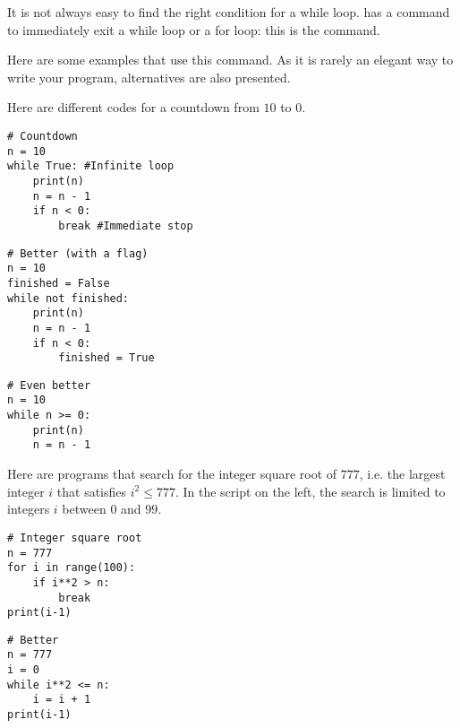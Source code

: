 \documentclass[11pt,class=report,crop=false]{standalone}
\begin{document}
\begin{cours}

It is not always easy to find the right condition for a \og{}while\fg{} loop. \Python{} has a command to immediately exit a \og{}while\fg{} loop
or a \og{}for\fg{} loop: this is the  command.

Here are some examples that use this  command. As it is rarely an elegant way to write your program, alternatives are also presented.

\begin{exemple}

Here are different codes for a countdown from $10$ to $0$.

\begin{minipage}{0.33\textwidth}
\begin{lstlisting}
# Countdown
n = 10
while True: #Infinite loop
    print(n)
    n = n - 1
    if n < 0:
        break #Immediate stop
\end{lstlisting}
\end{minipage}\qquad\qquad
\begin{minipage}{0.35\textwidth}
\begin{lstlisting}
# Better (with a flag)
n = 10
finished = False
while not finished:
    print(n)
    n = n - 1   
    if n < 0:
        finished = True
\end{lstlisting}
\end{minipage}
\begin{minipage}{0.2\textwidth}
\begin{lstlisting}
# Even better 
n = 10
while n >= 0:
    print(n)
    n = n - 1
\end{lstlisting}
\end{minipage}
\end{exemple}

\begin{exemple}

Here are programs that search for the integer square root of $777$, i.e. the largest integer $i$ that satisfies $i^2 \le 777$. In the script on the left, the search is limited to integers $i$ between $0$ and $99$.

\begin{minipage}{0.4\textwidth}
\begin{lstlisting}
# Integer square root
n = 777
for i in range(100):
    if i**2 > n:
        break
print(i-1)
\end{lstlisting}
\end{minipage}\qquad\qquad
\begin{minipage}{0.4\textwidth}
\begin{lstlisting}
# Better
n = 777
i = 0 
while i**2 <= n:
    i = i + 1
print(i-1) 
\end{lstlisting}
\end{minipage}
\end{exemple}


\end{cours}
\end{document}
